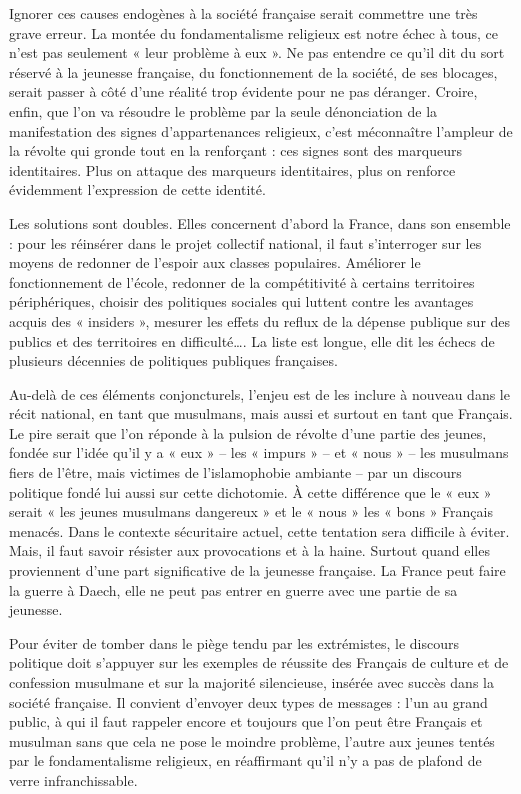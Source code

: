 Ignorer ces causes endogènes à la société française serait commettre une
très grave erreur. La montée du fondamentalisme religieux est notre
échec à tous, ce n'est pas seulement « leur problème à eux ». Ne pas
entendre ce qu'il dit du sort réservé à la jeunesse française, du
fonctionnement de la société, de ses blocages, serait passer à côté
d'une réalité trop évidente pour ne pas déranger. Croire, enfin, que
l'on va résoudre le problème par la seule dénonciation de la
manifestation des signes d'appartenances religieux, c'est méconnaître
l'ampleur de la révolte qui gronde tout en la renforçant : ces signes
sont des marqueurs identitaires. Plus on attaque des marqueurs
identitaires, plus on renforce évidemment l'expression de cette
identité.

Les solutions sont doubles. Elles concernent d'abord la France, dans son
ensemble : pour les réinsérer dans le projet collectif national, il faut
s'interroger sur les moyens de redonner de l'espoir aux classes
populaires. Améliorer le fonctionnement de l'école, redonner de la
compétitivité à certains territoires périphériques, choisir des
politiques sociales qui luttent contre les avantages acquis des «
insiders », mesurer les effets du reflux de la dépense publique sur des
publics et des territoires en difficulté\ldots. La liste est longue,
elle dit les échecs de plusieurs décennies de politiques publiques
françaises.

Au-delà de ces éléments conjoncturels, l'enjeu est de les inclure à
nouveau dans le récit national, en tant que musulmans, mais aussi et
surtout en tant que Français. Le pire serait que l'on réponde à la
pulsion de révolte d'une partie des jeunes, fondée sur l'idée qu'il y a
« eux » -- les « impurs » -- et « nous » -- les musulmans fiers de
l'être, mais victimes de l'islamophobie ambiante -- par un discours
politique fondé lui aussi sur cette dichotomie. À cette différence que
le « eux » serait « les jeunes musulmans dangereux » et le « nous » les
« bons » Français menacés. Dans le contexte sécuritaire actuel, cette
tentation sera difficile à éviter. Mais, il faut savoir résister aux
provocations et à la haine. Surtout quand elles proviennent d'une part
significative de la jeunesse française. La France peut faire la guerre à
Daech, elle ne peut pas entrer en guerre avec une partie de sa jeunesse.

Pour éviter de tomber dans le piège tendu par les extrémistes, le
discours politique doit s'appuyer sur les exemples de réussite des
Français de culture et de confession musulmane et sur la majorité
silencieuse, insérée avec succès dans la société française. Il convient
d'envoyer deux types de messages : l'un au grand public, à qui il faut
rappeler encore et toujours que l'on peut être Français et musulman sans
que cela ne pose le moindre problème, l'autre aux jeunes tentés par le
fondamentalisme religieux, en réaffirmant qu'il n'y a pas de plafond de
verre infranchissable.

